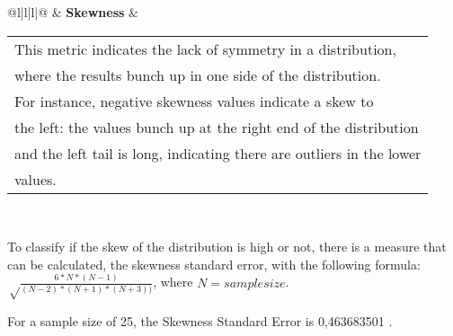 \begin{table}[]
\begin{tabular}{@{}l|l|l|@{}}
                          & \textbf{Skewness}                                                      & \begin{tabular}[c]{@{}l@{}}This metric indicates the lack of symmetry in a distribution, \\ where the results bunch up in one side of the distribution. \\ For instance, negative skewness values indicate a skew to \\ the left: the values bunch up  at the right end of the distribution \\ and the left tail is long, indicating there are outliers in the lower \\ values.\end{tabular}                                                                                                                                                                                                                                       \\ \bottomrule
\end{tabular}
\end{table}



To classify if the skew of the distribution is high or not, there is a measure that can be calculated, the skewness standard error, with the following formula: 
$\sqrt\frac{6*N*(N-1)}{(N-2)*(N+1)*(N+3))}$, where $N = sample size$.

For a sample size of 25, the Skewness Standard Error is 0,463683501
.

